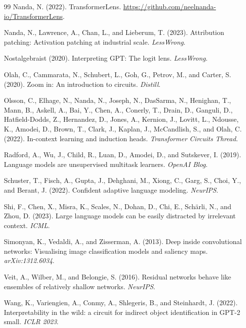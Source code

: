 \documentclass{article}
\begin{document}
\begin{thebibliography}{99}
Nanda, N. (2022).
TransformerLens.
\url{https://github.com/neelnanda-io/TransformerLens}.

Nanda, N., Lawrence, A., Chan, L., and Lieberum, T. (2023).
Attribution patching: Activation patching at industrial scale.
\textit{LessWrong}.

Nostalgebraist (2020).
Interpreting GPT: The logit lens.
\textit{LessWrong}.

Olah, C., Cammarata, N., Schubert, L., Goh, G., Petrov, M., and Carter, S. (2020).
Zoom in: An introduction to circuits.
\textit{Distill}.

Olsson, C., Elhage, N., Nanda, N., Joseph, N., DasSarma, N., Henighan, T.,
Mann, B., Askell, A., Bai, Y., Chen, A., Conerly, T., Drain, D., Ganguli, D.,
Hatfield-Dodds, Z., Hernandez, D., Jones, A., Kernion, J., Lovitt, L.,
Ndousse, K., Amodei, D., Brown, T., Clark, J., Kaplan, J., McCandlish, S.,
and Olah, C. (2022).
In-context learning and induction heads.
\textit{Transformer Circuits Thread}.

Radford, A., Wu, J., Child, R., Luan, D., Amodei, D., and Sutskever, I. (2019).
Language models are unsupervised multitask learners.
\textit{OpenAI Blog}.

Schuster, T., Fisch, A., Gupta, J., Dehghani, M., Xiong, C., Garg, S.,
Choi, Y., and Berant, J. (2022).
Confident adaptive language modeling.
\textit{NeurIPS}.

Shi, F., Chen, X., Misra, K., Scales, N., Dohan, D., Chi, E., Sch{\"a}rli, N.,
and Zhou, D. (2023).
Large language models can be easily distracted by irrelevant context.
\textit{ICML}.

Simonyan, K., Vedaldi, A., and Zisserman, A. (2013).
Deep inside convolutional networks: Visualising image classification
models and saliency maps.
\textit{arXiv:1312.6034}.

Veit, A., Wilber, M., and Belongie, S. (2016).
Residual networks behave like ensembles of relatively shallow networks.
\textit{NeurIPS}.

Wang, K., Variengien, A., Conmy, A., Shlegeris, B., and Steinhardt, J. (2022).
Interpretability in the wild: a circuit for indirect object identification in GPT-2 small.
\textit{ICLR 2023}.

\end{thebibliography}
\end{document}
